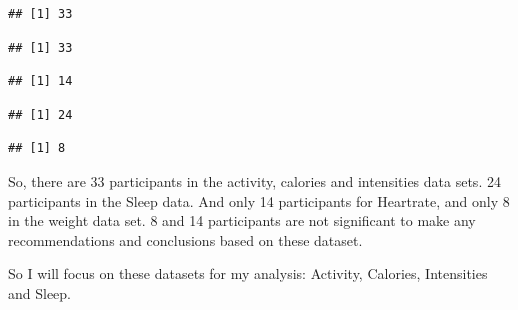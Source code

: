 \documentclass[
]{article}
\newenvironment{Shaded}{\begin{snugshade}}{\end{snugshade}}
\newcommand{\FunctionTok}[1]{\textcolor[rgb]{0.00,0.00,0.00}{#1}}
\newcommand{\NormalTok}[1]{#1}
\newcommand{\SpecialCharTok}[1]{\textcolor[rgb]{0.00,0.00,0.00}{#1}}
\begin{document}
\begin{verbatim}
## [1] 33
\end{verbatim}

\begin{Shaded}
\end{Shaded}

\begin{verbatim}
## [1] 33
\end{verbatim}

\begin{Shaded}
\end{Shaded}

\begin{verbatim}
## [1] 14
\end{verbatim}

\begin{Shaded}
\end{Shaded}

\begin{verbatim}
## [1] 24
\end{verbatim}

\begin{Shaded}
\end{Shaded}

\begin{verbatim}
## [1] 8
\end{verbatim}

So, there are 33 participants in the activity, calories and intensities
data sets. 24 participants in the Sleep data. And only 14 participants
for Heartrate, and only 8 in the weight data set. 8 and 14 participants
are not significant to make any recommendations and conclusions based on
these dataset.

So I will focus on these datasets for my analysis: Activity, Calories,
Intensities and Sleep.
\end{document}

